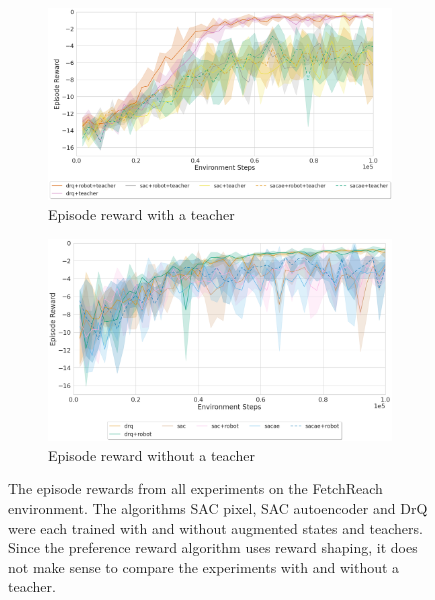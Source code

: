 \begin{figure}
    \centering
    \begin{subfigure}[b]{\textwidth}
        \centering
        \includegraphics[width=\textwidth]{images/results/reach/reward_teacher.png}
        \caption{Episode reward with a teacher}
        \label{fig:results:reach:reward-teacher}
    \end{subfigure}
    \hfill
    \begin{subfigure}[b]{\textwidth}
        \centering
        \includegraphics[width=\textwidth]{images/results/reach/reward_no_teacher.png}
        \caption{Episode reward without a teacher}
        \label{fig:results:reach:reward_no_teacher}
    \end{subfigure}
    \caption[The episode rewards from all experiments on the FetchReach environment.]{The episode rewards from all experiments on the FetchReach environment. The algorithms SAC pixel, SAC autoencoder and DrQ were each trained with and without augmented states and teachers. Since the preference reward algorithm uses reward shaping, it does not make sense to compare the experiments with and without a teacher.}
    \label{fig:results:reach-reward}
\end{figure}

